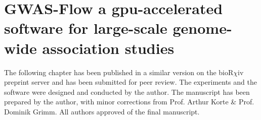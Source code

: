 
\chapter{GWAS-Flow a gpu-accelerated software for large-scale genome-wide association studies}

\label{Chapter3} %


The following chapter has been published in a similar version on the bioR$\chi$iv preprint
server \cite{Freudenthal_2019} and has been submitted for peer review. The experiments and
the software were designed and conducted by the author. The manuscript has been prepared
by the author, with minor corrections from Prof. Arthur Korte \& Prof. Dominik Grimm. All
authors approved of the final manuscript.


